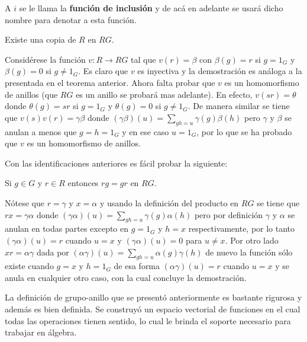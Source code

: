 A $i$ se le llama la \textbf{función de inclusión} y de acá en adelante se usará dicho nombre para denotar a esta función.

\begin{teorema}
Existe una copia de $R$ en $RG$.
\end{teorema}


\begin{proof*}
Considérese la función $v \colon R \to RG$ tal que $v(r) = \beta$ con $\beta(g) = r$ si $ g = 1_G $ y $\beta(g)=0$ si $g \neq 1_G$. Es claro que $v$ es inyectiva y la demostración es análoga a la presentada en el teorema anterior. Ahora falta probar que $v$ es un homomorfismo de anillos (que $RG$ es un anillo se probará mas adelante). En efecto, $v(sr)=\theta$ donde $\theta(g)=sr$ si $g=1_G$ y $\theta(g) = 0$ si $g \neq 1_G$. De manera similar se tiene que $v(s)v(r)=\gamma\beta$ donde $(\gamma\beta)(u)=\sum_{gh=u}\gamma(g)\beta(h) $ pero $\gamma $ y $\beta$ se anulan a menos que $g=h=1_G$ y en ese caso $u=1_G$, por lo que se ha probado que $v$ es un homomorfismo de anillos. \qedhere
\end{proof*}
Con las identificaciones anteriores es fácil probar la siguiente: 
\begin{propiedad}
Si $g \in G$ y $r \in R$ entonces $rg=gr$ en $RG$.
\end{propiedad}
\begin{proof*}
Nótese que $r=\gamma$ y $x=\alpha$ y usando la definición del producto en $RG$ se tiene que $rx=\gamma\alpha$ donde $(\gamma\alpha)(u)=\sum_{gh=u}\gamma(g) \alpha(h) $ pero por definición $\gamma$ y $\alpha$ se anulan en todas partes excepto en $g=1_G$ y $h=x$ respectivamente, por lo tanto $(\gamma\alpha)(u)=r$ cuando $u=x$ y $(\gamma\alpha)(u)=0$ para $u \neq x $.
Por otro lado $xr=\alpha\gamma$ dada por $(\alpha\gamma)(u)=\sum_{gh=u}\alpha(g)\gamma(h)$ de nuevo la función sólo existe cuando $g=x$ y $h=1_G$ de esa forma $(\alpha\gamma)(u)=r$ cuando $u=x$ y se anula en cualquier otro caso, con la cual concluye la demostración.
\end{proof*}

La definición de grupo-anillo que se presentó anteriormente es bastante rigurosa y además es bien definida. Se construyó un espacio vectorial de funciones en el cual todas las operaciones tienen sentido, lo cual le brinda el soporte necesario para trabajar en álgebra. 

